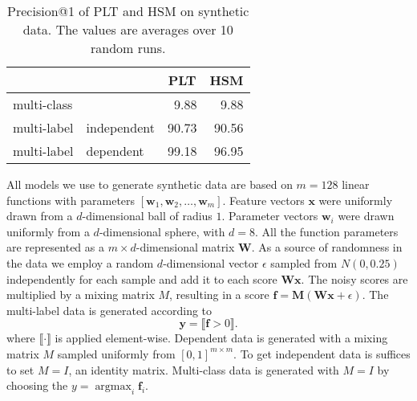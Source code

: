 \documentclass{article}
\renewcommand{\vec}[1]{\boldsymbol{#1}}
\newcommand{\bx}{\vec{x}}
\newcommand{\by}{\vec{y}}
\newcommand{\assert}[1]{\llbracket #1 \rrbracket}
\DeclareMathOperator*{\argmax}{\arg \max}
\begin{document}
{\begin{table}[t]
	\begin{center}
	\caption{Precision@1 of PLT and HSM on synthetic data. The values are averages over 10 random runs.}
	\label{tab:synthetic1}
\begin{tabular}{ll|rr}
	\toprule
	\multicolumn{2}{l|}{}                       & \multicolumn{1}{c}{PLT} & \multicolumn{1}{c}{HSM} \\
	\midrule
	\multicolumn{2}{l|}{multi-class}            & 9.88                    & 9.88                    \\
	\midrule
        multi-label & independent & 90.73                   & 90.56                   \\
	multi-label & dependent   & 99.18                   & 96.95                   \\
	\bottomrule
\end{tabular}
\end{center}
\vspace{-0.4cm}
\end{table}

All models we use to generate synthetic data are based on $m = 128$ linear functions 
with parameters $[\boldsymbol{w}_1, \boldsymbol{w}_2, \ldots, \boldsymbol{w}_m]$. Feature vectors $\bx$ were uniformly drawn from a $d$-dimensional ball of radius $1$. Parameter vectors $\boldsymbol{w}_i$ were drawn uniformly from a $d$-dimensional sphere, with $d = 8$. All the function parameters are represented as a $m \times d$-dimensional matrix $\boldsymbol{W}$. 
As a source of randomness in the data we employ a random $d$-dimensional vector $\epsilon$ sampled from $N(0, 0.25)$ independently for each sample and add it to each score $\boldsymbol{W}\bx$. The noisy scores are multiplied by a mixing matrix $M$, resulting in a score $\boldsymbol{f} = \boldsymbol{M} (\boldsymbol{W}\bx +  \epsilon ) $.
The multi-label data is generated according to
\begin{equation*}
\by = \assert{\boldsymbol{f} > 0}.
\end{equation*}
where $\assert{\cdot}$ is applied element-wise.
Dependent data is generated with a mixing matrix $M$ sampled uniformly from $[0, 1]^{m \times m}$. To get independent data is suffices to set $M = I$, an identity matrix.
Multi-class data is generated with $M = I$ by choosing the $y = \argmax_{i}{\boldsymbol{f}_{i}}$.

}
\end{document}
